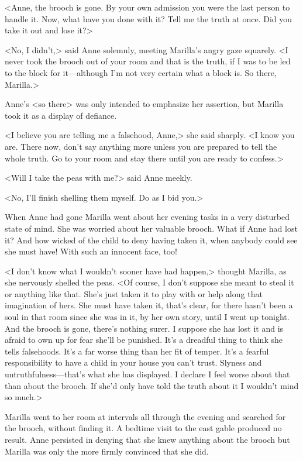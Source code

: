 <Anne, the brooch is gone. By your own admission you were the last person to handle it. Now, what have you done with it? Tell me the truth at once. Did you take it out and lose it?>

<No, I didn't,> said Anne solemnly, meeting Marilla's angry gaze squarely. <I never took the brooch out of your room and that is the truth, if I was to be led to the block for it—although I'm not very certain what a block is. So there, Marilla.>

Anne's <so there> was only intended to emphasize her assertion, but Marilla took it as a display of defiance.

<I believe you are telling me a falsehood, Anne,> she said sharply. <I know you are. There now, don't say anything more unless you are prepared to tell the whole truth. Go to your room and stay there until you are ready to confess.>

<Will I take the peas with me?> said Anne meekly.

<No, I'll finish shelling them myself. Do as I bid you.>

When Anne had gone Marilla went about her evening tasks in a very disturbed state of mind. She was worried about her valuable brooch. What if Anne had lost it? And how wicked of the child to deny having taken it, when anybody could see she must have! With such an innocent face, too!

<I don't know what I wouldn't sooner have had happen,> thought Marilla, as she nervously shelled the peas. <Of course, I don't suppose she meant to steal it or anything like that. She's just taken it to play with or help along that imagination of hers. She must have taken it, that's clear, for there hasn't been a soul in that room since she was in it, by her own story, until I went up tonight. And the brooch is gone, there's nothing surer. I suppose she has lost it and is afraid to own up for fear she'll be punished. It's a dreadful thing to think she tells falsehoods. It's a far worse thing than her fit of temper. It's a fearful responsibility to have a child in your house you can't trust. Slyness and untruthfulness—that's what she has displayed. I declare I feel worse about that than about the brooch. If she'd only have told the truth about it I wouldn't mind so much.>

Marilla went to her room at intervals all through the evening and searched for the brooch, without finding it. A bedtime visit to the east gable produced no result. Anne persisted in denying that she knew anything about the brooch but Marilla was only the more firmly convinced that she did.

